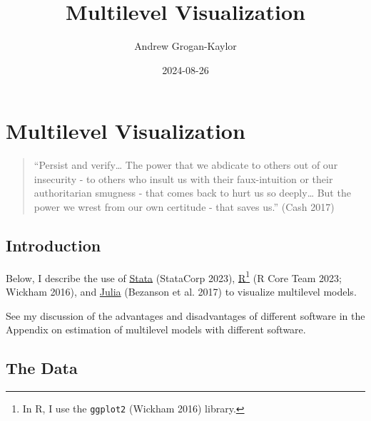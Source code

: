\documentclass[
  letterpaper,
  DIV=11,
  numbers=noendperiod]{scrreprt}
\title{Multilevel Visualization}
\author{Andrew Grogan-Kaylor}
\date{2024-08-26}
\renewcommand*\contentsname{Table of contents}
\newcommand\contentsname{Table of contents}
\begin{document}
\maketitle

\renewcommand*\contentsname{Table of contents}
{
\hypersetup{linkcolor=}
\setcounter{tocdepth}{2}
\tableofcontents
}
\listoffigures
\listoftables
{}

\chapter{Multilevel Visualization}\label{multilevel-visualization}

\begin{quote}
``Persist and verify\ldots{} The power that we abdicate to others out of
our insecurity - to others who insult us with their faux-intuition or
their authoritarian smugness - that comes back to hurt us so
deeply\ldots{} But the power we wrest from our own certitude - that
saves us.'' (Cash 2017)
\end{quote}

\section{Introduction}\label{introduction}

Below, I describe the use of \href{https://www.stata.com/}{Stata}
(StataCorp 2023), \href{https://www.r-project.org/}{R}\footnote{In R, I
  use the \texttt{ggplot2} (Wickham 2016) library.} (R Core Team 2023;
Wickham 2016), and \href{https://www.julialang.org/}{Julia} (Bezanson et
al. 2017) to visualize multilevel models.

\begin{tcolorbox}[enhanced jigsaw, coltitle=black, opacityback=0, title=\textcolor{quarto-callout-tip-color}{\faLightbulb}\hspace{0.5em}{Comparison of Software}, toprule=.15mm, colback=white, bottomrule=.15mm, colbacktitle=quarto-callout-tip-color!10!white, breakable, bottomtitle=1mm, arc=.35mm, left=2mm, colframe=quarto-callout-tip-color-frame, opacitybacktitle=0.6, leftrule=.75mm, titlerule=0mm, rightrule=.15mm, toptitle=1mm]

See my discussion of the advantages and disadvantages of different
software in the Appendix on estimation of multilevel models with
different software.

\end{tcolorbox}

\section{The Data}\label{sec-data}
\end{document}
